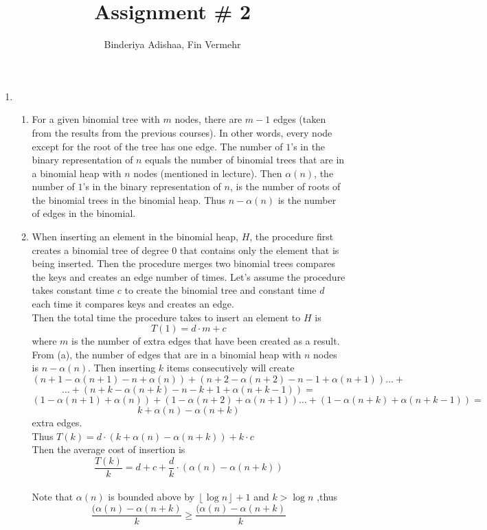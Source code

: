\documentclass{article}
\begin{document}
\title{Assignment \# 2}
\author{Binderiya Adishaa,
Fin Vermehr}
\maketitle

 
\begin{enumerate}
\item 
    \begin{enumerate}
        \item For a given binomial tree with $m$ nodes, there are $m-1$ edges (taken from the results from the previous courses). In other words, every node except for the root of the tree has one edge. The number of $1$'s in the binary representation of $n$ equals the number of binomial trees that are in a binomial heap with $n$ nodes (mentioned in lecture). Then $\alpha(n)$, the number of $1$'s in the binary representation of $n$, is the number of roots of the binomial trees in the binomial heap. Thus $n-\alpha(n)$ is the number of edges in the binomial.
        \item When inserting an element in the binomial heap, $H$, the procedure first creates a binomial tree of degree 0 that contains only the element that is being inserted. Then the procedure merges two binomial trees compares the keys and creates an edge number of times. Let's assume the procedure takes constant time $c$ to create the binomial tree and constant time $d$ each time it compares keys and creates an edge.
        \\Then the total time the procedure takes to insert an element to $H$ is $$T(1) = d\cdot m + c$$ where $m$ is the number of extra edges that have been created as a result.
        \\ From (a), the number of edges that are in a binomial heap with $n$ nodes is $n - \alpha(n)$. Then inserting $k$ items consecutively will create 
        $$(n + 1 -\alpha(n+1) - n + \alpha(n)) + (n + 2 -\alpha(n+2) - n - 1 + \alpha(n + 1)) \dots+$$ 
        $$\dots+(n + k -\alpha(n+k) - n - k + 1 + \alpha(n + k - 1))=$$
        $$ (1 -\alpha(n+1) + \alpha(n)) + (1 -\alpha(n+2) + \alpha(n + 1)) \dots + (1 -\alpha(n+k) + \alpha(n+k-1))=$$
        $$k + \alpha(n) - \alpha(n+k)$$
        extra edges.
        \\Thus $T(k) = d \cdot (k + \alpha(n) - \alpha(n+k)) + k \cdot c$
        \\Then the average cost of insertion is $$\frac{T(k)}{k} = d + c + \frac{d}{k}\cdot(\alpha(n) - \alpha(n+k))$$
        \\ Note that $\alpha(n)$ is bounded above by $\left \lfloor{\log n}\right \rfloor + 1$ and $ k > \log n$ ,thus \\$$\frac{(\alpha(n) - \alpha(n+k)}{k}\ge\frac{(\alpha(n) - \alpha(n+k)}{k}$$

\end{enumerate}
\end{enumerate}
\end{document}
